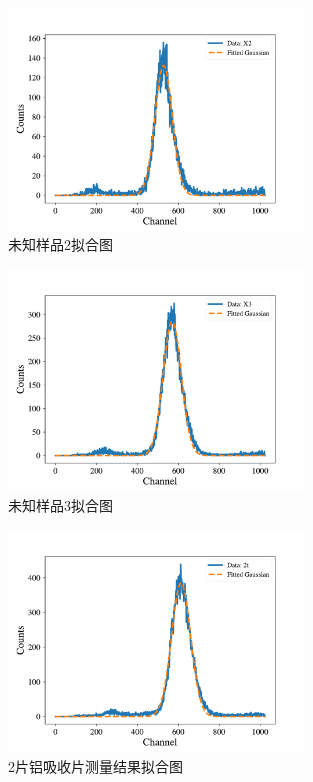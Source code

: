 \documentclass{article}
\begin{document}
    \begin{figure}[htbp]
        \centering
        \includegraphics[width=0.7\textwidth]{../plot/Fitted_X2.pdf}
        \caption{未知样品2拟合图\label{fig:Fitted_X2}}
    \end{figure}
    \begin{figure}[htbp]
        \centering
        \includegraphics[width=0.7\textwidth]{../plot/Fitted_X3.pdf}
        \caption{未知样品3拟合图\label{fig:Fitted_X3}}
    \end{figure}
    \begin{figure}[htbp]
        \centering
        \includegraphics[width=0.7\textwidth]{../plot/Fitted_2t.pdf}
        \caption{2片铝吸收片测量结果拟合图\label{fig:Fitted_2t}}
    \end{figure}
\end{document}
